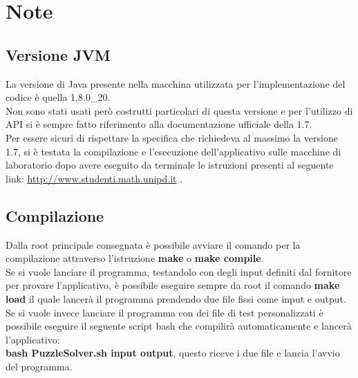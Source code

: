 % 
%
% 
%

\section{Note}
	\subsection{Versione JVM}
La versione di Java presente nella macchina utilizzata per l'implementazione del codice è quella 1.8.0\_20. \\
Non sono stati usati però costrutti particolari di questa versione e per l'utilizzo di API si è sempre fatto riferimento alla documentazione ufficiale della 1.7. \\
Per essere sicuri di rispettare la specifica che richiedeva al massimo la versione 1.7, si è testata la compilazione e l'esecuzione dell'applicativo sulle macchine di laboratorio dopo avere eseguito da terminale le istruzioni presenti al seguente link: \href{http://www.studenti.math.unipd.it/index.php?id=corsi#c620}{http://www.studenti.math.unipd.it} .

	\subsection{Compilazione}
Dalla root principale consegnata è possibile avviare il comando per la compilazione attraverso l'istruzione \textbf{make} o \textbf{make compile}. \\
Se si vuole lanciare il programma, testandolo con degli input definiti dal fornitore per provare l'applicativo, è possibile eseguire sempre da root il comando \textbf{make load} il quale lancerà il programma prendendo due file fissi come input e output. \\
Se si vuole invece lanciare il programma con dei file di test personalizzati è possibile eseguire il seguente script bash che compilirà automaticamente e lancerà l'applicativo: \\
\textbf{bash PuzzleSolver.sh input output}, questo riceve i due file e lancia l'avvio del programma.

